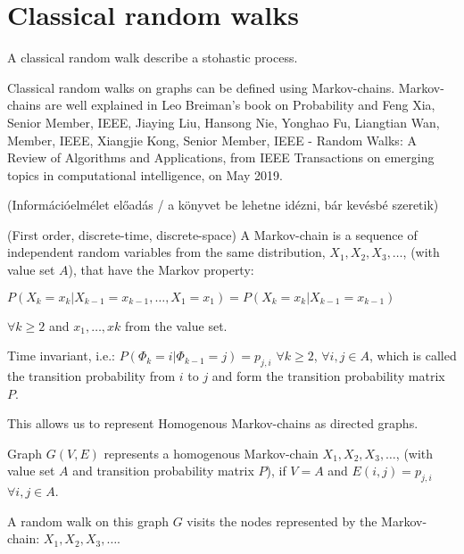 \section{Classical random walks}

A classical random walk describe a stohastic process.


Classical random walks on graphs can be defined using Markov-chains. Markov-chains
are well explained in Leo Breiman's book on Probability\cite{breiman_probability_1992} and Feng Xia, Senior Member, IEEE, Jiaying Liu, Hansong Nie, Yonghao Fu, Liangtian Wan, Member, IEEE,
Xiangjie Kong, Senior Member, IEEE - Random Walks: A Review of Algorithms and Applications, from IEEE Transactions on emerging topics in computational intelligence, on May 2019.

(Információelmélet előadás / a könyvet be lehetne idézni, bár kevésbé szeretik)

 (First order, discrete-time, discrete-space) A Markov-chain is a sequence of independent random variables from the same distribution, $X_1, X_2, X_3, \dots$, (with value set $A$), that have the Markov property:


$P(X_k = x_k | X_{k-1} = x_{k-1}, \dots, X_1 = x_1) = P(X_k = x_k | X_{k-1} = x_{k-1})$

$\forall k\geq{}2$ and $x_{1},\dots, x{k}$ from the value set.

 Time invariant, i.e.:
$P(\Phi_k = i | \Phi_{k-1} = j) = p_{j,i}$ $\forall k\geq{}2$, $\forall i,j \in{} A$, which is called the transition probability from $i$ to $j$ and form the transition probability matrix $P$.

This allows us to represent Homogenous Markov-chains as directed graphs.

Graph $G(V,E)$ represents a homogenous Markov-chain $X_1, X_2, X_3, \dots$, (with value set $A$ and transition probability matrix $P$), if $V=A$ and $E(i,j) = p_{j,i}$ $\forall{}i,j\in{}A$.

A random walk on this graph $G$ visits the nodes represented by the Markov-chain: $X_1, X_2, X_3, \dots$.
